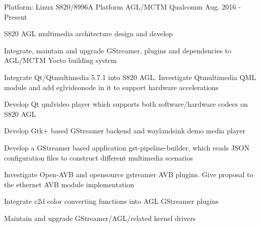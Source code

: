 

\begin{cventries}

  \cventry
    {Platform: Linux} %
    {S820/8996A Platform AGL/MCTM} %
    {Qualcomm} %
    {Aug. 2016 - Present} %
    {
      \begin{cvitems} %
        \item {S820 AGL multimedia architecture design and develop}
        \item {Integrate, maintain and upgrade GStreamer, plugins and dependencies to AGL/MCTM Yocto building system}
        \item {Integrate Qt/Qtmultimedia 5.7.1 into S820 AGL. Investigate Qtmultimedia QML module and add eglvideonode in it to support hardware accelerations}
		\item {Develop Qt qmlvideo player which supports both software/hardware codecs on S820 AGL}
		\item {Develop Gtk+ based GStreamer backend and waylandsink demo media player}
        \item {Develop a GStreamer based application gst-pipeline-builder, which reads JSON configuration files to  construct different multimedia scenarios}
        \item {Investigate Open-AVB and opensource gstreamer AVB plugins. Give proposal to the ethernet AVB module implementation}
		\item {Integrate c2d color converting functions into AGL GStreamer plugins}
		\item {Maintain and upgrade GStreamer/AGL/related kernel drivers}
      \end{cvitems}
    }


\end{cventries}
